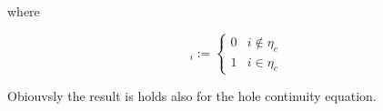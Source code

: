 where

\begin{equation}
[\mathbb{I}_c]_i := \left\{ \begin{array}{ll}
0 & i \notin \eta_c \\
1 & i \in \eta_c
\end{array}  \right.
\end{equation} 

Obiouvsly the result is holds also for the hole continuity equation. 

%
%
%
%
%
%
%
%
%
%
%
%
%

